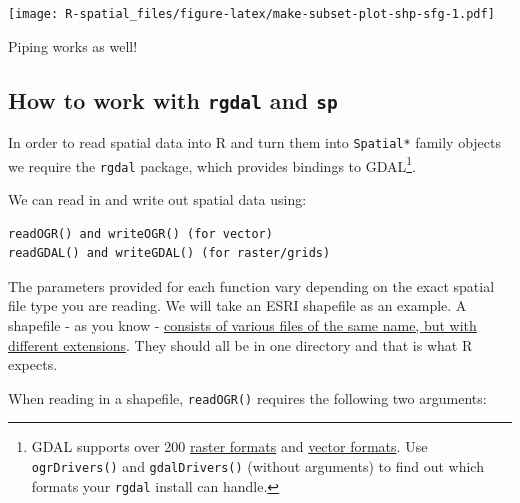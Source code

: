 \documentclass[]{book}
\newenvironment{Shaded}{\begin{snugshade}}{\end{snugshade}}
\newcommand{\KeywordTok}[1]{\textcolor[rgb]{0.13,0.29,0.53}{\textbf{#1}}}
\newcommand{\DataTypeTok}[1]{\textcolor[rgb]{0.13,0.29,0.53}{#1}}
\newcommand{\DecValTok}[1]{\textcolor[rgb]{0.00,0.00,0.81}{#1}}
\newcommand{\StringTok}[1]{\textcolor[rgb]{0.31,0.60,0.02}{#1}}
\newcommand{\OperatorTok}[1]{\textcolor[rgb]{0.81,0.36,0.00}{\textbf{#1}}}
\newcommand{\NormalTok}[1]{#1}
\let\rmarkdownfootnote\footnote%
\def\footnote{\protect\rmarkdownfootnote}
\begin{document}
\texttt{[image: R-spatial\_files/figure-latex/make-subset-plot-shp-sfg-1.pdf]}

Piping works as well!

\begin{Shaded}
\end{Shaded}

\subsection{\texorpdfstring{How to work with \texttt{rgdal} and
\texttt{sp}}{How to work with rgdal and sp}}\label{how-to-work-with-rgdal-and-sp}

In order to read spatial data into R and turn them into
\texttt{Spatial*} family objects we require the \texttt{rgdal} package,
which provides bindings to GDAL\footnote{GDAL supports over 200
  \href{http://www.gdal.org/formats_list.html}{raster formats} and
  \href{http://www.gdal.org/ogr_formats.html}{vector formats}. Use
  \texttt{ogrDrivers()} and \texttt{gdalDrivers()} (without arguments)
  to find out which formats your \texttt{rgdal} install can handle.}.

We can read in and write out spatial data using:

\begin{verbatim}
readOGR() and writeOGR() (for vector)  
readGDAL() and writeGDAL() (for raster/grids)
\end{verbatim}

The parameters provided for each function vary depending on the exact
spatial file type you are reading. We will take an ESRI shapefile as an
example. A shapefile - as you know -
\href{https://en.wikipedia.org/wiki/Shapefile}{consists of various files
of the same name, but with different extensions}. They should all be in
one directory and that is what R expects.

When reading in a shapefile, \texttt{readOGR()} requires the following
two arguments:
\end{document}
